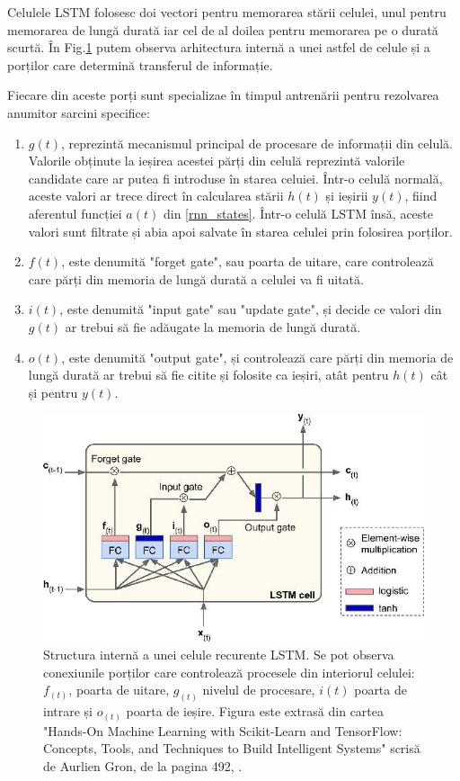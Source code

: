 \documentclass[a4paper,12pt]{book}
\begin{document}
				Celulele LSTM folosesc doi vectori pentru memorarea stării celulei, unul pentru memorarea de lungă durată iar cel de al doilea pentru memorarea pe o durată scurtă. În Fig.\ref{fig:lstm} putem observa arhitectura internă a unei astfel de celule și a porților care determină transferul de informație. \par
				Fiecare din aceste porți sunt specializae în timpul antrenării pentru rezolvarea anumitor sarcini specifice:
				\begin{enumerate}
					\item $g(t)$, reprezintă mecanismul principal de procesare de informații din celulă. Valorile obținute la ieșirea acestei părți din celulă reprezintă valorile candidate care ar putea fi introduse în starea celuiei.  Într-o celulă normală, aceste valori ar trece direct în calcularea stării $h(t)$ și ieșirii $y(t)$, fiind aferentul funcției $a(t)$ din \ref{rnn_states}. Într-o celulă LSTM însă, aceste valori sunt filtrate și abia apoi salvate în starea celulei prin folosirea porților.
					\item $f(t)$, este denumită "forget gate", sau poarta de uitare, care controlează care părți din memoria de lungă durată a celulei va fi uitată.
					\item $i(t)$, este denumită "input gate" sau "update gate", și decide ce valori din $g(t)$ ar trebui să fie adăugate la memoria de lungă durată.
					\item $o(t)$, este denumită "output gate", și controlează care părți din memoria de lungă durată ar trebui să fie citite și folosite ca ieșiri, atât pentru $h(t)$ cât și pentru $y(t)$. 
				\end{enumerate}
			
					\begin{figure}[t]
					\centering
					\includegraphics[scale=0.5]{lstm}
					\caption{Structura internă a unei celule recurente LSTM. Se pot observa conexiunile porților care controlează procesele din interiorul celulei: $f_{(t)}$, poarta de uitare, $g_{(t)}$ nivelul de procesare, $i{(t)}$ poarta de intrare și $o_{(t)}$ poarta de ieșire. Figura este extrasă din cartea "Hands-On Machine Learning with Scikit-Learn and TensorFlow: Concepts, Tools, and Techniques to Build Intelligent Systems" scrisă de Aurlien Gron, de la pagina 492, \cite{hands}.}
					\label{fig:lstm}
				\end{figure} 
\end{document}
